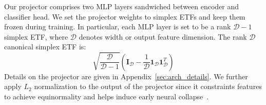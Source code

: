 Our projector comprises two MLP layers sandwiched between encoder and classifier head. 
We set the projector weights to simplex ETFs and keep them frozen during training.
In particular, each MLP layer is set to be a rank $\mathcal{D}-1$ simplex ETF, where $\mathcal{D}$ denotes width or output feature dimension. 
The rank $\mathcal{D}$ canonical simplex ETF is:
\begin{equation*}
    \sqrt{\frac{\mathcal{D}}{\mathcal{D}-1}} (\mathbf{I}_\mathcal{D} - \frac{1}{\mathcal{D}} \mathbf{1}_\mathcal{D} \mathbf{1}_\mathcal{D}^T)
\end{equation*}
Details on the projector are given in Appendix~\ref{sec:arch_details}.
We further apply $L_2$ normalization to the output of the projector since it constraints features to achieve equinormality 
and helps induce early neural collapse~\cite{haas2023linking}.



